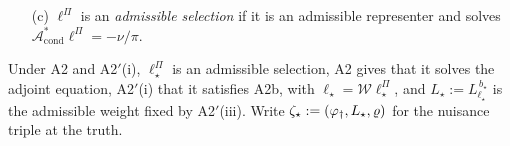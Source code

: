\begin{definition}
\begin{enumerate}
{anchored at $b$} is
\begin{equation}\label{eq:weightdef}
L^{\,b}_{\ell}(u,z)\;:=\;\int_{0}^{u}\ell(v,z)\,dv\;+\;b(z),
\qquad (u,z)\in\IR\times\IR^{p},
\end{equation}
the integral taken entrywise and well defined because each entry of $\ell(\cdot,z)$ is continuous and
bounded. It is the unique
function that is differentiable in $u$ at \emph{every} point with $\partial_uL^{\,b}_\ell=\ell$ and
$L^{\,b}_{\ell}(0,\cdot)=b$. The weight is \emph{admissible} if $E\|b(\Delta Z)\|^{2}<\infty$, the norm
being Frobenius.
\item[(c)] $\ell^\Pi$ is an \emph{admissible selection} if it is an admissible representer and solves
$\mathcal A^\ast_{\mathrm{cond}}\ell^\Pi=-\nu/\pi$.
\end{enumerate}
Under A2 and A2$'$(i), $\ell^\Pi_\star$ is an admissible selection, A2 gives that it solves the
adjoint equation, A2$'$(i) that it satisfies A2b, with $\ell_\star=\mathcal W\ell^\Pi_\star$, and
$L_\star:=L^{\,b_\star}_{\ell_\star}$ is the admissible weight fixed by A2$'$(iii). Write
$\zeta_\star:=(\varphi_{\dagger},L_\star,\varrho)$ for the nuisance triple at the truth.
\end{definition}

